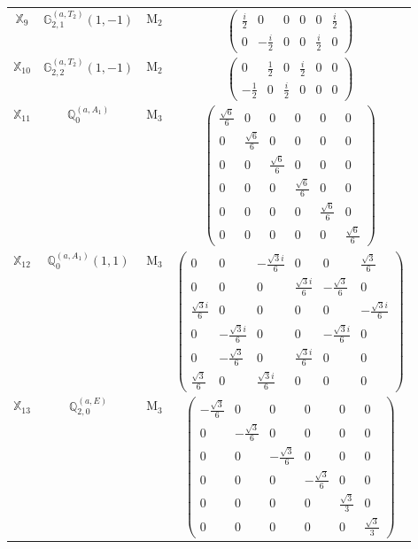 \documentclass[fleqn,10pt,landscape]{article}
\begin{document}
\begin{itemize}
\begin{center}
\begin{longtable}{c|c|c|c}
$ \mathbb{X}_{9} $ & $\mathbb{G}_{2,1}^{(a,T_{2})}(1,-1)$ & M$_{2}$ & $\begin{pmatrix} \frac{i}{2} & 0 & 0 & 0 & 0 & \frac{i}{2} \\ 0 & - \frac{i}{2} & 0 & 0 & \frac{i}{2} & 0 \end{pmatrix}$ \\
$ \mathbb{X}_{10} $ & $\mathbb{G}_{2,2}^{(a,T_{2})}(1,-1)$ & M$_{2}$ & $\begin{pmatrix} 0 & \frac{1}{2} & 0 & \frac{i}{2} & 0 & 0 \\ - \frac{1}{2} & 0 & \frac{i}{2} & 0 & 0 & 0 \end{pmatrix}$ \\ \hline
$ \mathbb{X}_{11} $ & $\mathbb{Q}_{0}^{(a,A_{1})}$ & M$_{3}$ & $\begin{pmatrix} \frac{\sqrt{6}}{6} & 0 & 0 & 0 & 0 & 0 \\ 0 & \frac{\sqrt{6}}{6} & 0 & 0 & 0 & 0 \\ 0 & 0 & \frac{\sqrt{6}}{6} & 0 & 0 & 0 \\ 0 & 0 & 0 & \frac{\sqrt{6}}{6} & 0 & 0 \\ 0 & 0 & 0 & 0 & \frac{\sqrt{6}}{6} & 0 \\ 0 & 0 & 0 & 0 & 0 & \frac{\sqrt{6}}{6} \end{pmatrix}$ \\
$ \mathbb{X}_{12} $ & $\mathbb{Q}_{0}^{(a,A_{1})}(1,1)$ & M$_{3}$ & $\begin{pmatrix} 0 & 0 & - \frac{\sqrt{3} i}{6} & 0 & 0 & \frac{\sqrt{3}}{6} \\ 0 & 0 & 0 & \frac{\sqrt{3} i}{6} & - \frac{\sqrt{3}}{6} & 0 \\ \frac{\sqrt{3} i}{6} & 0 & 0 & 0 & 0 & - \frac{\sqrt{3} i}{6} \\ 0 & - \frac{\sqrt{3} i}{6} & 0 & 0 & - \frac{\sqrt{3} i}{6} & 0 \\ 0 & - \frac{\sqrt{3}}{6} & 0 & \frac{\sqrt{3} i}{6} & 0 & 0 \\ \frac{\sqrt{3}}{6} & 0 & \frac{\sqrt{3} i}{6} & 0 & 0 & 0 \end{pmatrix}$ \\
$ \mathbb{X}_{13} $ & $\mathbb{Q}_{2,0}^{(a,E)}$ & M$_{3}$ & $\begin{pmatrix} - \frac{\sqrt{3}}{6} & 0 & 0 & 0 & 0 & 0 \\ 0 & - \frac{\sqrt{3}}{6} & 0 & 0 & 0 & 0 \\ 0 & 0 & - \frac{\sqrt{3}}{6} & 0 & 0 & 0 \\ 0 & 0 & 0 & - \frac{\sqrt{3}}{6} & 0 & 0 \\ 0 & 0 & 0 & 0 & \frac{\sqrt{3}}{3} & 0 \\ 0 & 0 & 0 & 0 & 0 & \frac{\sqrt{3}}{3} \end{pmatrix}$ \\

\end{longtable}
\end{center}
\end{itemize}
\end{document}
